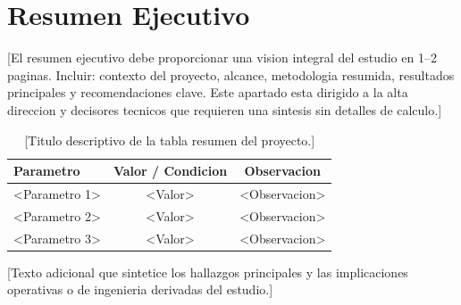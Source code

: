 \newpage
\section*{Resumen Ejecutivo}

[El resumen ejecutivo debe proporcionar una vision integral del estudio en 1--2 paginas.
Incluir: contexto del proyecto, alcance, metodologia resumida, resultados principales
y recomendaciones clave. Este apartado esta dirigido a la alta direccion y decisores
tecnicos que requieren una sintesis sin detalles de calculo.]

\vspace{1cm}

\begin{table}[htbp]
    \centering
    \caption{[Titulo descriptivo de la tabla resumen del proyecto.]}
    \label{tab:resumen_ejecutivo}
    \begin{tabularx}{\textwidth}{@{}Xcc@{}}
        \toprule
        \textbf{Parametro} & \textbf{Valor / Condicion} & \textbf{Observacion} \\
        \midrule
        <Parametro 1> & <Valor> & <Observacion> \\
        <Parametro 2> & <Valor> & <Observacion> \\
        <Parametro 3> & <Valor> & <Observacion> \\
        \bottomrule
    \end{tabularx}
\end{table}

[Texto adicional que sintetice los hallazgos principales y las implicaciones
operativas o de ingenieria derivadas del estudio.]

\newpage
